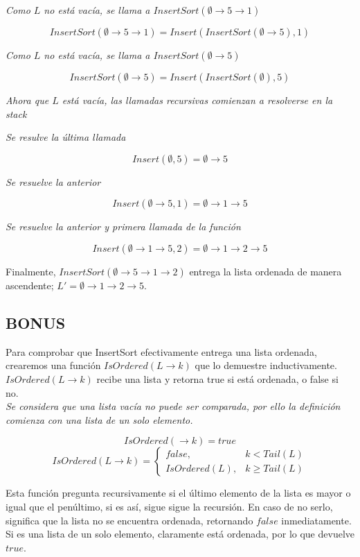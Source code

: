 \documentclass[../doc.tex]{subfiles}
\begin{document}
\emph{Como $L$ no está vacía, se llama a $InsertSort(\emptyset \rightarrow 5 \rightarrow 1)$}

\[InsertSort(\emptyset \rightarrow 5 \rightarrow 1) = Insert(InsertSort(\emptyset \rightarrow 5),1) \]

\emph{Como $L$ no está vacía, se llama a $InsertSort(\emptyset \rightarrow 5)$}

\[InsertSort(\emptyset \rightarrow 5) = Insert(InsertSort(\emptyset),5) \]

\emph{Ahora que $L$ está vacía, las llamadas recursivas comienzan a resolverse en la stack}

\emph{Se resulve la última llamada}

\[Insert(\emptyset,5) = \emptyset \rightarrow 5\]

\emph{Se resuelve la anterior}

\[Insert(\emptyset \rightarrow 5,1) = \emptyset \rightarrow 1 \rightarrow 5\]

\emph{Se resuelve la anterior y primera llamada de la función}

\[Insert(\emptyset \rightarrow 1 \rightarrow 5,2) = \emptyset \rightarrow 1 \rightarrow 2 \rightarrow 5\]

Finalmente, $InsertSort(\emptyset \rightarrow 5 \rightarrow 1 \rightarrow 2)$ entrega la lista ordenada de manera ascendente; $L' = \emptyset \rightarrow 1 \rightarrow 2 \rightarrow 5$. 

\subsection{BONUS}
Para comprobar que InsertSort efectivamente entrega una lista ordenada, crearemos una función $IsOrdered(L \rightarrow k)$ que lo demuestre inductivamente.
$IsOrdered(L \rightarrow k)$ recibe una lista y retorna true si está ordenada, o false si no.\\

\emph{Se considera que una lista vacía no puede ser comparada, por ello la definición comienza con una lista de un solo elemento.}

\[IsOrdered(\rightarrow k) = true\]
\[IsOrdered(L \rightarrow k) =
\left\{
\begin{array}{lr}
  false, & k < Tail(L)\\
  IsOrdered(L), & k \ge Tail(L)
\end{array} \right .\]

Esta función pregunta recursivamente si el último elemento de la lista es mayor o igual que el penúltimo, si es así, sigue sigue la recursión. En caso de no serlo, significa que la lista no se encuentra ordenada, retornando $false$ inmediatamente.\\
Si es una lista de un solo elemento, claramente está ordenada, por lo que devuelve $true$.\\
\end{document}
